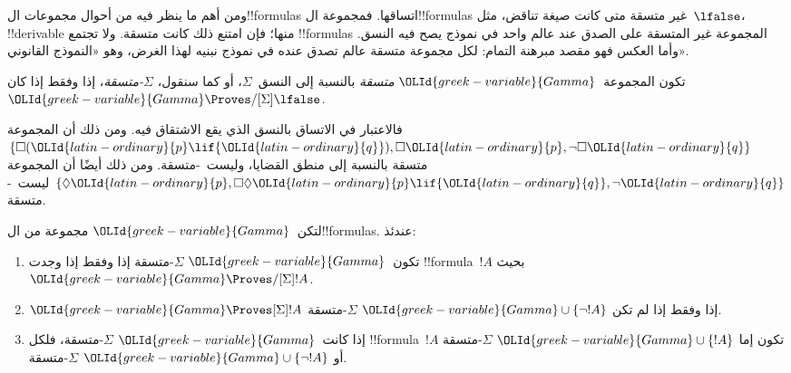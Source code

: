 \documentclass[../../../include/open-logic-section]{subfiles}
\begin{document}


ومن أهم ما ينظر فيه من أحوال مجموعات ال!!{formula}s اتساقها.
فمجموعة ال!!{formula}s غير متسقة متى كانت صيغة تناقض،
مثل~$\lfalse$، !!{derivable} منها؛ فإن امتنع ذلك كانت متسقة.
ولا تجتمع !!{formula}s المجموعة غير المتسقة على الصدق عند عالم واحد
في نموذج يصح فيه النسق. وأما العكس فهو مقصد مبرهنة التمام:
لكل مجموعة متسقة عالم تصدق عنده في نموذج نبنيه لهذا الغرض،
وهو «النموذج القانوني».

\begin{defn}
  تكون المجموعة~${\OLId{greek-variable}{Gamma}}$ \emph{متسقة} بالنسبة إلى النسق~$\Sigma$، أو
  كما سنقول، \emph{$\Sigma$-متسقة}، إذا وفقط إذا كان
  ${\OLId{greek-variable}{Gamma}} \Proves/[\Sigma] \lfalse$.
\end{defn}

فالاعتبار في الاتساق بالنسق الذي يقع الاشتقاق فيه. ومن ذلك أن المجموعة
$\{\Box({\OLId{latin-ordinary}{p}} \lif {\OLId{latin-ordinary}{q}}), \Box {\OLId{latin-ordinary}{p}}, \lnot\Box {\OLId{latin-ordinary}{q}}\}$ متسقة بالنسبة إلى منطق القضايا،
وليست~-متسقة. ومن ذلك أيضًا أن المجموعة
$\{\Diamond {\OLId{latin-ordinary}{p}}, \Box\Diamond {\OLId{latin-ordinary}{p}} \lif {\OLId{latin-ordinary}{q}}, \lnot {\OLId{latin-ordinary}{q}}\}$
ليست~-متسقة.

\begin{prop}
  لتكن~${\OLId{greek-variable}{Gamma}}$ مجموعة من ال!!{formula}s. عندئذ:
  \begin{enumerate}
  \item تكون~${\OLId{greek-variable}{Gamma}}$ $\Sigma$-متسقة إذا وفقط إذا وجدت
    !!{formula}~$!A$ بحيث~${\OLId{greek-variable}{Gamma}} \Proves/[\Sigma] !A$.
  \item {}%
    ${\OLId{greek-variable}{Gamma}} \Proves[\Sigma] !A$ إذا وفقط إذا لم تكن
    ${\OLId{greek-variable}{Gamma}} \cup \{\lnot!A\}$ $\Sigma$-متسقة.
  \item {}%
    إذا كانت~${\OLId{greek-variable}{Gamma}}$ $\Sigma$-متسقة، فلكل !!{formula}~$!A$ تكون إما
    ${\OLId{greek-variable}{Gamma}} \cup \{!A\}$ $\Sigma$-متسقة أو
    ${\OLId{greek-variable}{Gamma}} \cup \{\lnot!A\}$ $\Sigma$-متسقة.
  \end{enumerate}
\end{prop}
\end{document}
